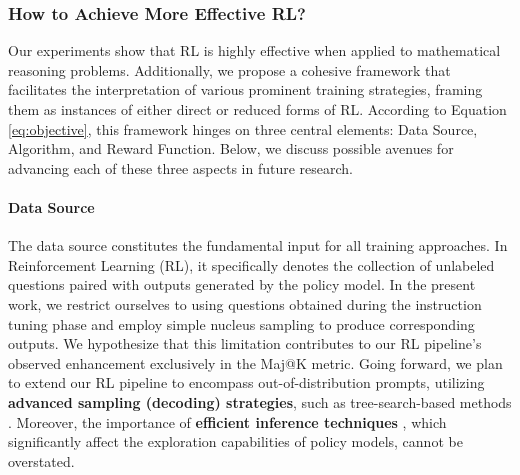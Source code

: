 \begin{itemize}[topsep=0pt]
\begin{itemize}[topsep=0pt]
\subsubsection{How to Achieve More Effective RL?}
\label{sec:effec_rl}
Our experiments show that RL is highly effective when applied to mathematical reasoning problems. Additionally, we propose a cohesive framework that facilitates the interpretation of various prominent training strategies, framing them as instances of either direct or reduced forms of RL. According to Equation \ref{eq:objective}, this framework hinges on three central elements: Data Source, Algorithm, and Reward Function. Below, we discuss possible avenues for advancing each of these three aspects in future research.

\paragraph{Data Source} The data source constitutes the fundamental input for all training approaches. In Reinforcement Learning (RL), it specifically denotes the collection of unlabeled questions paired with outputs generated by the policy model. In the present work, we restrict ourselves to using questions obtained during the instruction tuning phase and employ simple nucleus sampling to produce corresponding outputs. We hypothesize that this limitation contributes to our RL pipeline's observed enhancement exclusively in the Maj@K metric. Going forward, we plan to extend our RL pipeline to encompass out-of-distribution prompts, utilizing \textbf{advanced sampling (decoding) strategies}, such as tree-search-based methods \citep{yao2023tree}. Moreover, the importance of \textbf{efficient inference techniques} \citep{xia-etal-2023-speculative,leviathan2023fast,kwon2023efficient,xia2024unlocking}, which significantly affect the exploration capabilities of policy models, cannot be overstated.


\end{itemize}
\end{itemize}
